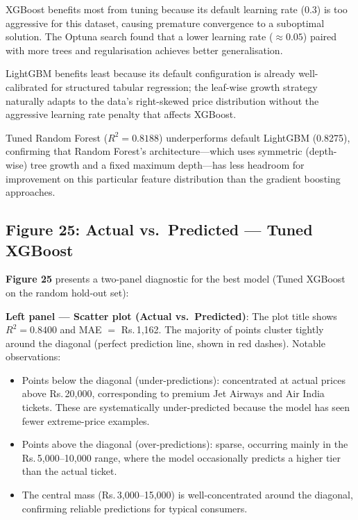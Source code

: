 \documentclass[12pt, a4paper]{article}
\begin{document}
XGBoost benefits most from tuning because its default learning rate (0.3)
is too aggressive for this dataset, causing premature convergence to a
suboptimal solution.  The Optuna search found that a lower learning rate
($\approx 0.05$) paired with more trees and regularisation achieves better
generalisation.

LightGBM benefits least because its default configuration is already
well-calibrated for structured tabular regression; the leaf-wise growth
strategy naturally adapts to the data's right-skewed price distribution
without the aggressive learning rate penalty that affects XGBoost.

Tuned Random Forest ($R^2 = 0.8188$) underperforms default LightGBM
(0.8275), confirming that Random Forest's architecture---which uses symmetric
(depth-wise) tree growth and a fixed maximum depth---has less headroom for
improvement on this particular feature distribution than the gradient boosting
approaches.

\subsection{Figure 25: Actual vs.\ Predicted --- Tuned XGBoost}

\textbf{Figure 25} presents a two-panel diagnostic for the best model
(Tuned XGBoost on the random hold-out set):

\textbf{Left panel --- Scatter plot (Actual vs.\ Predicted)}:
The plot title shows $R^2 = 0.8400$ and MAE $= $ Rs.\,1{,}162.  The
majority of points cluster tightly around the diagonal (perfect prediction
line, shown in red dashes).  Notable observations:
\begin{itemize}
    \item Points below the diagonal (under-predictions): concentrated at
    actual prices above Rs.\,20{,}000, corresponding to premium Jet Airways
    and Air India tickets.  These are systematically under-predicted because
    the model has seen fewer extreme-price examples.
    \item Points above the diagonal (over-predictions): sparse, occurring
    mainly in the Rs.\,5{,}000--10{,}000 range, where the model occasionally
    predicts a higher tier than the actual ticket.
    \item The central mass (Rs.\,3{,}000--15{,}000) is well-concentrated
    around the diagonal, confirming reliable predictions for typical consumers.
\end{itemize}
\end{document}
